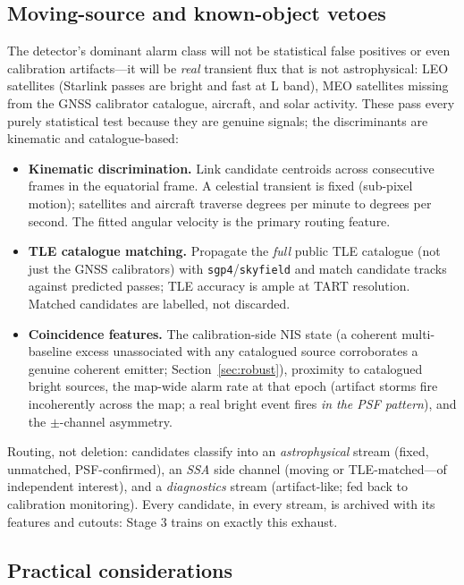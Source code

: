 \documentclass[11pt]{article}
\begin{document}
\subsection{Moving-source and known-object vetoes}
\label{sec:veto}

The detector's dominant alarm class will not be statistical false positives or even calibration
artifacts---it will be \emph{real} transient flux that is not astrophysical: LEO satellites
(Starlink passes are bright and fast at L band), MEO satellites missing from the GNSS calibrator
catalogue, aircraft, and solar activity. These pass every purely statistical test because they are
genuine signals; the discriminants are kinematic and catalogue-based:
\begin{itemize}[leftmargin=*]
  \item \textbf{Kinematic discrimination.} Link candidate centroids across consecutive frames in
        the equatorial frame. A celestial transient is fixed (sub-pixel motion); satellites and
        aircraft traverse degrees per minute to degrees per second. The fitted angular velocity is
        the primary routing feature.
  \item \textbf{TLE catalogue matching.} Propagate the \emph{full} public TLE catalogue (not just
        the GNSS calibrators) with \texttt{sgp4}/\texttt{skyfield} and match candidate tracks
        against predicted passes; TLE accuracy is ample at TART resolution. Matched candidates are
        labelled, not discarded.
  \item \textbf{Coincidence features.} The calibration-side NIS state (a coherent multi-baseline
        excess unassociated with any catalogued source corroborates a genuine coherent emitter;
        Section~\ref{sec:robust}), proximity to catalogued bright sources, the map-wide alarm rate
        at that epoch (artifact storms fire incoherently across the map; a real bright event fires
        \emph{in the PSF pattern}), and the $\pm$-channel asymmetry.
\end{itemize}
Routing, not deletion: candidates classify into an \emph{astrophysical} stream (fixed, unmatched,
PSF-confirmed), an \emph{SSA} side channel (moving or TLE-matched---of independent interest), and a
\emph{diagnostics} stream (artifact-like; fed back to calibration monitoring). Every candidate, in
every stream, is archived with its features and cutouts: Stage 3 trains on exactly this exhaust.

\subsection{Practical considerations}
\label{sec:prac}
\end{document}

